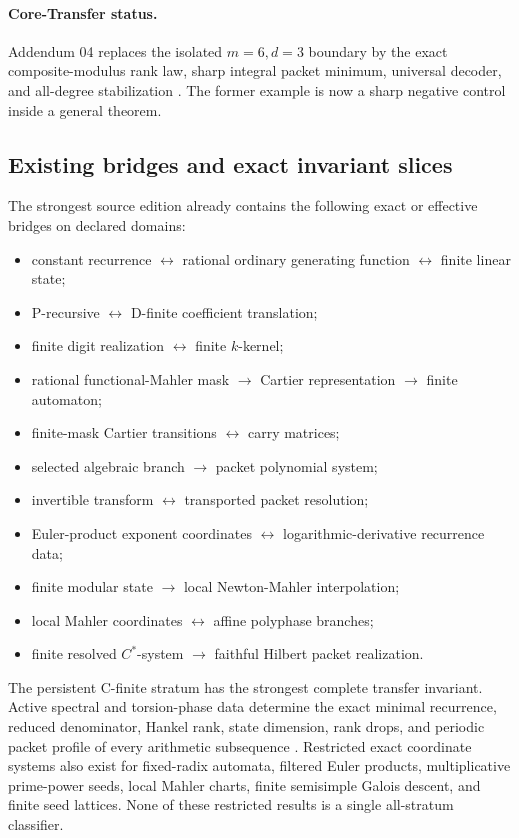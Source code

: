 \documentclass[11pt]{article}
\theoremstyle{definition}
\theoremstyle{remark}
\begin{document}
\paragraph{Core-Transfer status.}
Addendum 04 replaces the isolated \(m=6,d=3\) boundary by the exact composite-modulus rank law, sharp integral packet minimum, universal decoder, and all-degree stabilization \cite{CT4}. The former example is now a sharp negative control inside a general theorem.

\subsection{Existing bridges and exact invariant slices}

The strongest source edition already contains the following exact or effective bridges on declared domains:

\begin{itemize}
\item constant recurrence \(\leftrightarrow\) rational ordinary generating function \(\leftrightarrow\) finite linear state;
\item P-recursive \(\leftrightarrow\) D-finite coefficient translation;
\item finite digit realization \(\leftrightarrow\) finite \(k\)-kernel;
\item rational functional-Mahler mask \(\to\) Cartier representation \(\to\) finite automaton;
\item finite-mask Cartier transitions \(\leftrightarrow\) carry matrices;
\item selected algebraic branch \(\to\) packet polynomial system;
\item invertible transform \(\leftrightarrow\) transported packet resolution;
\item Euler-product exponent coordinates \(\leftrightarrow\) logarithmic-derivative recurrence data;
\item finite modular state \(\to\) local Newton-Mahler interpolation;
\item local Mahler coordinates \(\leftrightarrow\) affine polyphase branches;
\item finite resolved \(C^*\)-system \(\to\) faithful Hilbert packet realization.
\end{itemize}

The persistent C-finite stratum has the strongest complete transfer invariant. Active spectral and torsion-phase data determine the exact minimal recurrence, reduced denominator, Hankel rank, state dimension, rank drops, and periodic packet profile of every arithmetic subsequence \cite{SEQ}. Restricted exact coordinate systems also exist for fixed-radix automata, filtered Euler products, multiplicative prime-power seeds, local Mahler charts, finite semisimple Galois descent, and finite seed lattices. None of these restricted results is a single all-stratum classifier.
\end{document}
